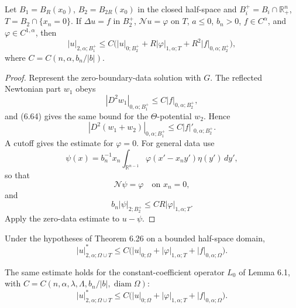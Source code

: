 \begin{theorem}
\label{gt-ch06-thm-6-26}
Let $B_1=B_R(x_0)$, $B_2=B_{2R}(x_0)$ in the closed half-space and
$B_i^+=B_i\cap\mathbb R^n_+$, $T=B_2\cap\{x_n=0\}$.  If
$\Delta u=f$ in $B_2^+$, $\mathcal Nu=\varphi$ on $T$, $a\le0$, $b_n>0$,
$f\in C^\alpha$, and $\varphi\in C^{1,\alpha}$, then
\begin{equation}\tag{6.65}
|u|_{2,\alpha;B_1^+}\le C\bigl(|u|_{0;B_2^+}+R|\varphi|_{1,\alpha;T}+R^2|f|_{0,\alpha;B_2^+}\bigr),
\end{equation}
where $C=C(n,\alpha,b_n/|b|)$.
\end{theorem}
\begin{proof}
\sketch Represent the zero-boundary-data solution with $G$.  The reflected
Newtonian part $w_1$ obeys
\begin{equation}
\tag{6.66}
|D^2w_1|_{0,\alpha;B_1^+}
\leq C|f|_{0,\alpha;B_2^+},
\end{equation}
and (6.64) gives the same bound for the $\Theta$-potential $w_2$. Hence
\begin{equation}
\tag{6.67}
|D^2(w_1+w_2)|_{0,\alpha;B_1^+}
\leq C|f|'_{0,\alpha;B_2^+}.
\end{equation}
A cutoff gives the estimate for $\varphi=0$.
For general data use
\begin{equation}\tag{6.68}
\psi(x)=b_n^{-1}x_n\int_{\mathbb R^{n-1}}\varphi(x'-x_ny')\eta(y')\,dy',
\end{equation}
so that
\begin{equation}\tag{6.69}
\mathcal N\psi=\varphi\quad\text{on }x_n=0,
\end{equation}
and
\begin{equation}\tag{6.70}
b_n|\psi|_{2;B_2^+}\le CR|\varphi|_{1,\alpha;T}.
\end{equation}
Apply the zero-data estimate to $u-\psi$.
\end{proof}

\begin{lemma}
\label{gt-ch06-lem-6-27}
Under the hypotheses of Theorem 6.26 on a bounded half-space domain,
\[
|u|^*_{2,\alpha;\Omega\cup T}
\le C\bigl(|u|_{0;\Omega}+|\varphi|_{1,\alpha;T}+|f|_{0,\alpha;\Omega}\bigr).
\]
\end{lemma}
\begin{lemma}
\label{gt-ch06-lem-6-28}
The same estimate holds for the constant-coefficient operator $L_0$ of Lemma
6.1, with $C=C(n,\alpha,\lambda,\Lambda,b_n/|b|,\operatorname{diam}\Omega)$:
\begin{equation}\tag{6.71}
|u|^*_{2,\alpha;\Omega\cup T}
\le C\bigl(|u|_{0;\Omega}+|\varphi|_{1,\alpha;T}+|f|_{0,\alpha;\Omega}\bigr).
\end{equation}
\end{lemma}

